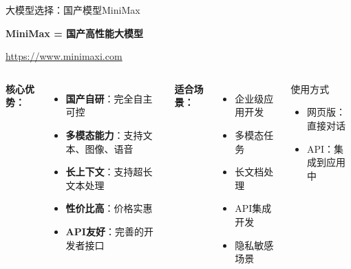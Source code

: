 \begin{frame}{大模型选择：国产模型MiniMax}
	\scriptsize
	\begin{center}
		\Huge \textbf{MiniMax = 国产高性能大模型}

		\vspace{0.5cm}

		\normalsize
		\textcolor{blue}{\url{https://www.minimaxi.com}}
	\end{center}

	\vspace{0.3cm}

	\begin{columns}
		\textbf{核心优势：}
		\begin{itemize}
			\item \textbf{国产自研}：完全自主可控
			\item \textbf{多模态能力}：支持文本、图像、语音
			\item \textbf{长上下文}：支持超长文本处理
			\item \textbf{性价比高}：价格实惠
			\item \textbf{API友好}：完善的开发者接口
		\end{itemize}

		\textbf{适合场景：}
		\begin{itemize}
			\item 企业级应用开发
			\item 多模态任务
			\item 长文档处理
			\item API集成开发
			\item 隐私敏感场景
		\end{itemize}

		\vspace{0.3cm}

		\begin{block}{使用方式}
			\begin{itemize}
				\item 网页版：直接对话
				\item API：集成到应用中
			\end{itemize}
		\end{block}
	\end{columns}
\end{frame}


